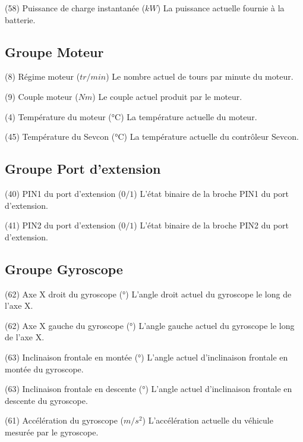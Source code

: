 {(58) Puissance de charge instantanée (\(kW\))}
{La puissance actuelle fournie à la batterie.}

\subsection{Groupe Moteur}

{(8) Régime moteur (\(tr/min\))}
{Le nombre actuel de tours par minute du moteur.}

{(9) Couple moteur (\(Nm\))}
{Le couple actuel produit par le moteur.}

{(4) Température du moteur (°C)}
{La température actuelle du moteur.}

{(45) Température du Sevcon (°C)}
{La température actuelle du contrôleur Sevcon.}

\subsection{Groupe Port d'extension}

{(40) PIN1 du port d'extension (\(0/1\))}
{L'état binaire de la broche PIN1 du port d’extension.}

{(41) PIN2 du port d'extension (\(0/1\))}
{L'état binaire de la broche PIN2 du port d’extension.}

\subsection{Groupe Gyroscope}

{(62) Axe X droit du gyroscope (°)}
{L'angle droit actuel du gyroscope le long de l'axe X.}

{(62) Axe X gauche du gyroscope (°)}
{L'angle gauche actuel du gyroscope le long de l'axe X.}

{(63) Inclinaison frontale en montée (°)}
{L'angle actuel d'inclinaison frontale en montée du gyroscope.}

{(63) Inclinaison frontale en descente (°)}
{L'angle actuel d'inclinaison frontale en descente du gyroscope.}

{(61) Accélération du gyroscope (\(m/s^2\))}
{L'accélération actuelle du véhicule mesurée par le gyroscope.}

